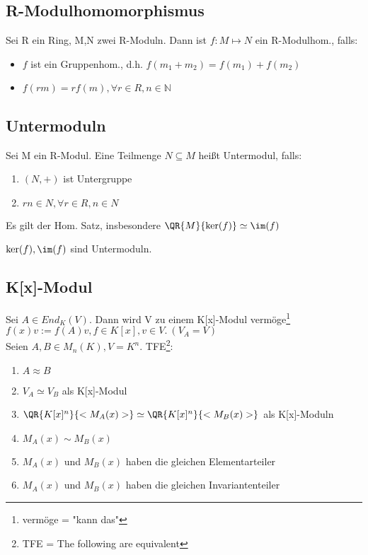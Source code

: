 \subsection{R-Modulhomomorphismus}
Sei R ein Ring, M,N zwei R-Moduln. Dann ist $f:M\mapsto N$ ein R-Modulhom., falls:
\begin{itemize}
	\item $f$ ist ein Gruppenhom., d.h. $f(m_1+m_2) = f(m_1)+f(m_2)$
	\item $f(rm) = rf(m), \forall r \in R, n\in \mathbb{N}$
\end{itemize}

\subsection{Untermoduln}
Sei M ein R-Modul. Eine Teilmenge $N \subseteq M$ heißt Untermodul, falls:
\begin{enumerate}
	\item $(N,+)$ ist Untergruppe
	\item $rn \in N, \forall r \in R, n\in N$
\end{enumerate}
Es gilt der Hom. Satz, insbesondere $\QR{M}{\ker(f)} \simeq \im(f)$

\begin{remark}
$\ker(f),\im(f)$ sind Untermoduln.
\end{remark}

\subsection{K[x]-Modul}
Sei $A \in End_K(V)$. Dann wird V zu einem K[x]-Modul vermöge\footnote{vermöge = "kann das"} $f(x)v := f(A)v, f\in K[x], v \in V.~(V_A=V)$\\
Seien $A,B \in M_n(K), V=K^n$. TFE\footnote{TFE = The following are equivalent}:
\begin{enumerate}
	\item $A \approx B$
	\item $V_A \simeq V_B$ als K[x]-Modul
	\item $\QR{K[x]^n}{<M_A(x)>} \simeq \QR{K[x]^n}{<M_B(x)>}$ als K[x]-Moduln
	\item $M_A(x) \sim M_B(x)$
	\item $M_A(x)$ und $M_B(x)$ haben die gleichen Elementarteiler
	\item $M_A(x)$ und $M_B(x)$ haben die gleichen Invariantenteiler
\end{enumerate}

